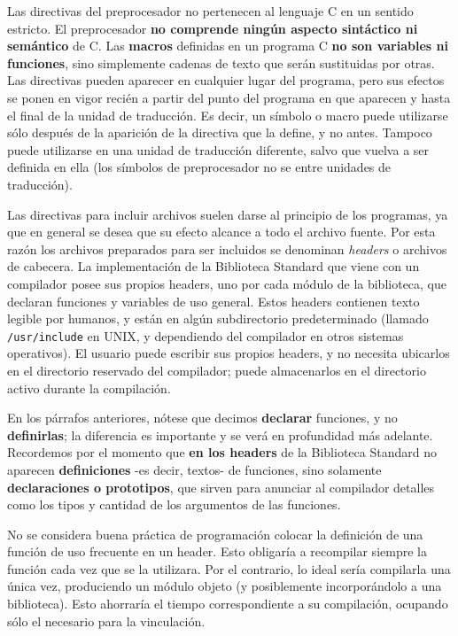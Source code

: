 Las directivas del preprocesador no pertenecen al lenguaje C en un sentido estricto. El preprocesador \textbf{no comprende ningún aspecto sintáctico ni semántico} de C. Las \textbf{macros} definidas en un programa C \textbf{no son variables ni funciones}, sino simplemente cadenas de texto que serán sustituidas por otras. Las directivas pueden aparecer en cualquier lugar del programa, pero sus efectos se ponen en vigor recién a partir del punto del programa en que aparecen y hasta el final de la unidad de traducción. Es decir, un símbolo o macro puede utilizarse sólo después de la aparición de la directiva que la define, y no antes. Tampoco puede utilizarse en una unidad de traducción diferente, salvo que vuelva a ser definida en ella (los símbolos de preprocesador no se  entre unidades de traducción).

Las directivas para incluir archivos suelen darse al principio de los programas, ya que en general se desea que su efecto alcance a todo el archivo fuente. Por esta razón los archivos preparados para ser incluidos se denominan \textit{headers} o archivos de cabecera. La implementación de la Biblioteca Standard que viene con un compilador posee sus propios headers, uno por cada módulo de la biblioteca, que declaran funciones y variables de uso general. Estos headers contienen texto legible por humanos, y están en algún subdirectorio predeterminado (llamado \texttt{/usr/include} en UNIX, y dependiendo del compilador en otros sistemas operativos). El usuario puede escribir sus propios headers, y no necesita ubicarlos en el directorio reservado del compilador; puede almacenarlos en el directorio activo durante la compilación. 

En los párrafos anteriores, nótese que decimos \textbf{declarar} funciones, y no \textbf{definirlas}; la diferencia es importante y se verá en profundidad más adelante. Recordemos por el momento que \textbf{en los headers} de la Biblioteca Standard no aparecen \textbf{definiciones} -es decir, textos- de funciones, sino solamente \textbf{declaraciones o prototipos}, que sirven para anunciar al compilador detalles como los tipos y cantidad de los argumentos de las funciones.

No se considera buena práctica de programación colocar la definición de una función de uso frecuente en un header. Esto obligaría a recompilar siempre la función cada vez que se la utilizara. Por el contrario, lo ideal sería compilarla una única vez, produciendo un módulo objeto (y posiblemente incorporándolo a una biblioteca). Esto ahorraría el tiempo correspondiente a su compilación, ocupando
sólo el necesario para la vinculación.

